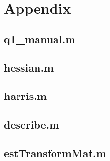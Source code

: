 \documentclass[a4paper, 10pt, conference]{ieeeconf}
\begin{document}
\section*{Appendix}

\subsection*{q1\_manual.m}

\newpage

\subsection*{hessian.m}

\newpage

\subsection*{harris.m}

\newpage

\subsection*{describe.m}

\newpage

\subsection*{estTransformMat.m}

\newpage
\end{document}
